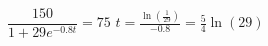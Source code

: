 {$\dfrac{150}{1 + 29e^{-0.8t}} = 75$ }
{$t = \frac{\ln\left(\frac{1}{29}\right)}{-0.8} = \frac{5}{4}\ln(29)$}
